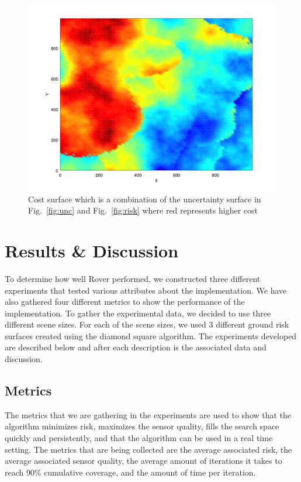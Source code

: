 \documentclass{article}
\begin{document}
\begin{figure}[h!]

    \includegraphics[width=1\columnwidth]{tasefigs/costsurf.png}

    \caption{Cost surface which is a combination of the uncertainty surface
    in Fig.~\ref{fig:unc} and Fig.~\ref{fig:risk} where red represents higher
cost}

    \label{fig:cost}

\end{figure}

\section{Results \& Discussion}

To determine how well Rover performed, we constructed three different
experiments that tested various attributes about the implementation. We have
also gathered four different metrics to show the performance of the
implementation. To gather the experimental data, we decided to use three
different scene sizes. For each of the scene sizes, we used 3 different ground
risk surfaces created using the diamond square algorithm. The experiments
developed are described below and after each description is the associated data
and discussion.

\subsection{Metrics}

The metrics that we are gathering in the experiments are used to show that the
algorithm minimizes risk, maximizes the sensor quality, fills the search space
quickly and persistently, and that the algorithm can be used in a real time
setting. The metrics that are being collected are the average associated risk,
the average associated sensor quality, the average amount of iterations it
takes to reach 90\% cumulative coverage, and the amount of time per iteration.
\end{document}

